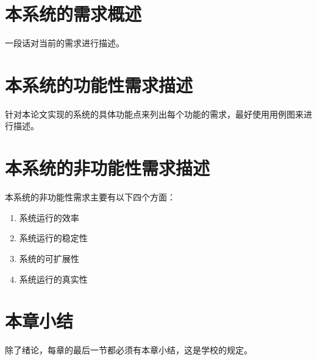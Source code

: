 \section{本系统的需求概述}

一段话对当前的需求进行描述。

\section{本系统的功能性需求描述}

针对本论文实现的系统的具体功能点来列出每个功能的需求，最好使用用例图来进行描述。

\section{本系统的非功能性需求描述}

本系统的非功能性需求主要有以下四个方面：
\begin{enumerate}
\item 系统运行的效率
\item 系统运行的稳定性
\item 系统的可扩展性
\item 系统运行的真实性
\end{enumerate}
\section{本章小结}

除了绪论，每章的最后一节都必须有本章小结，这是学校的规定。